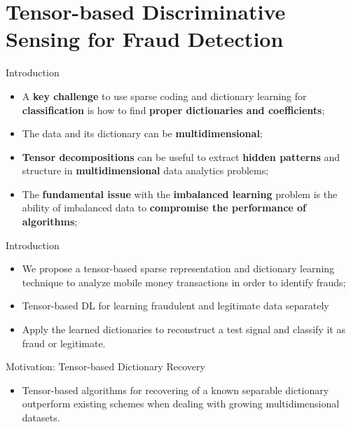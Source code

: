 \documentclass[newPxFont, numfooter, sectionpages]{beamer}
\begin{document}
%
%
\section{Tensor-based Discriminative Sensing for Fraud Detection}
\begin{frame}[c]{Introduction}
	\begin{itemize}
		\item A \textbf{key challenge} to use sparse coding and dictionary learning for \textbf{classification} is how to find \textbf{proper dictionaries and coefficients};
		\item The data and its dictionary can be \textbf{multidimensional};
		\item \textbf{Tensor decompositions} can be useful to extract \textbf{hidden patterns} and structure in \textbf{multidimensional} data analytics problems;
		\item The \textbf{fundamental issue} with the \textbf{imbalanced learning} problem is the ability of imbalanced data to \textbf{compromise the performance of algorithms};
	\end{itemize}
\end{frame}
\begin{frame}[c]{Introduction}
	\begin{itemize}
		\item We propose a tensor-based sparse representation and dictionary learning technique to analyze mobile money transactions in order to identify frauds; 
		\item Tensor-based DL for learning fraudulent and legitimate data separately
		\item Apply the learned dictionaries to reconstruct a test signal and classify it as fraud or legitimate.
	\end{itemize}
\end{frame}
\begin{frame}[c]{Motivation: Tensor-based Dictionary Recovery}
	\begin{itemize}
		\item Tensor-based algorithms for recovering of a known separable dictionary outperform existing schemes when dealing with growing multidimensional datasets.
	\end{itemize}
\end{frame}
\end{document}
